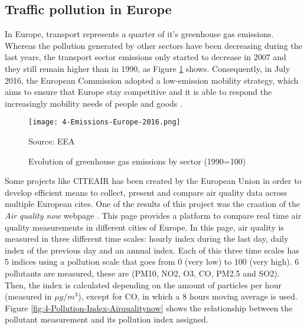 \subsection{Traffic pollution in Europe}
In Europe, transport represents a quarter of it's greenhouse gas emissions. Whereas the pollution generated by other sectors have been decreasing during the last years, the transport sector emissions only started to decrease in 2007 and they still remain higher than in 1990, as Figure \ref{fig:4-Emissions-Europe-2016} shows. Consequently, in July 2016, the European Commission adopted a low-emission mobility strategy, which aims to ensure that Europe stay competitive and it is able to respond the increasingly mobility needs of people and goods \cite{EuStrat}. 

%
%
%



\cite{AirQualityEEA16}

\begin{figure}[!h]
	\begin{center}
		\texttt{[image: 4-Emissions-Europe-2016.png]}	
		\caption{Evolution of greenhouse gas emissions by sector (1990=100)}{Source: \ac{EEA}}
		\label{fig:4-Emissions-Europe-2016}
	\end{center}
\end{figure}


Some projects like \ac{CITEAIR} has been created by the European Union \cite{citeair} in order to develop efficient means to collect, present and compare air quality data across multiple European cites. One of the results of this project was the craation of the \emph{Air quality now} webpage \cite{airqualitynow}. This page provides a platform to compare real time air quality measurements in different cities of Europe. In this page, air quality is measured in three different time scales: hourly index during the last day, daily index of the previous day and an annual index. Each of this three time scales has 5 indices using a pollution scale that goes from 0 (very low) to 100 (very high). 6 pollutants are measured, these are (PM10, NO2, O3, CO, PM2.5 and SO2). Then, the index is calculated depending on the amount of particles per hour (measured in $\mu g/m^3$), except for CO, in which a 8 hours moving average is used. Figure \ref{fig:4-Pollution-Index-Airqualitynow} shows the relationship between the pollutant measurement and its pollution index assigned.

